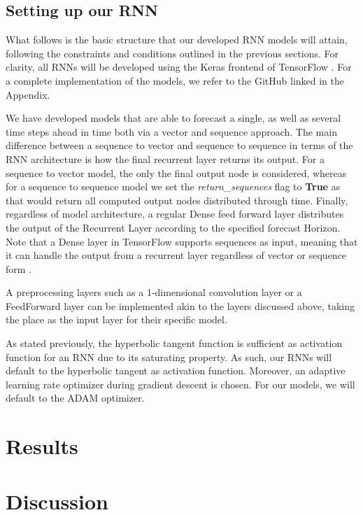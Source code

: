 \documentclass
[twocolumn,
secnumarabic,
nobibnotes,
aps,
prl,
reprint,
groupedaddress,
amsmath,
amssymb,
]{revtex4-2}
\begin{document}
\subsection{Setting up our RNN}
What follows is the basic structure that our developed RNN models will attain, following the constraints and conditions outlined in the previous sections. For clarity, all RNNs will be developed using the Keras frontend of TensorFlow \cite{tensorflow2015-whitepaper}. For a complete implementation of the models, we refer to the GitHub linked in the Appendix. 

We have developed models that are able to forecast a single, as well as several time steps ahead in time both via a vector and sequence approach. The main difference between a sequence to vector and sequence to sequence in terms of the RNN architecture is how the final recurrent layer returns its output. For a sequence to vector model, the only the final output node is considered, whereas for a sequence to sequence model we set the \textit{return\_sequences} flag to \textbf{True} as that would return all computed output nodes distributed through time. Finally, regardless of model architecture, a regular Dense feed forward layer distributes the output of the Recurrent Layer according to the specified forecast Horizon. Note that a Dense layer in TensorFlow supports sequences as input, meaning that it can handle the output from a recurrent layer regardless of vector or sequence form \cite{Geron2019}. 

A preprocessing layers such as a 1-dimensional convolution layer or a FeedForward layer can be implemented akin to the layers discussed above, taking the place as the input layer for their specific model.

As stated previously, the hyperbolic tangent function is sufficient as activation function for an RNN due to its saturating property. As such, our RNNs will default to the hyperbolic tangent as activation function. Moreover, an adaptive learning rate optimizer during gradient descent is chosen. For our models, we will default to the ADAM optimizer.

\section{Results}

\section{Discussion}
\end{document}
